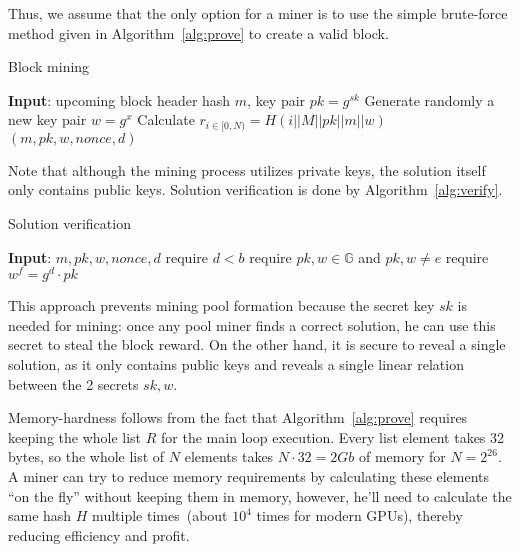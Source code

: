 Thus, we assume that the only option for a miner is to use the simple brute-force method given in Algorithm~\ref{alg:prove} to
create a valid block.

\begin{algorithm}[H]
    \caption{Block mining}
    \label{alg:prove}
    \begin{algorithmic}[1]
        \State \textbf{Input}: upcoming block header hash $m$, key pair $pk=g^{sk}$
        \State Generate randomly a new key pair $w=g^x$
        \State Calculate $r_{i \in [0,N)}=H(i||M||pk||m||w)$
        \State \Return $(m,pk,w,nonce,d)$
        \EndIf
        \EndWhile
    \end{algorithmic}
\end{algorithm}

Note that although the mining process utilizes private keys, the solution itself
only contains public keys. Solution verification is done by Algorithm~\ref{alg:verify}.

\begin{algorithm}[H]
    \caption{Solution verification}
    \label{alg:verify}
    \begin{algorithmic}[1]
        \State \textbf{Input}: $m,pk,w,nonce,d$
        \State require $d < b$
        \State require $pk,w\in \mathbb{G}$ and $pk,w \ne e$
        \State require $w^f = g^d \cdot pk$
    \end{algorithmic}
\end{algorithm}

This approach prevents mining pool formation because the secret key $sk$ is needed for mining: once any pool miner finds a correct solution, he can use this secret to steal the block reward. On the other hand, it is secure to reveal a single solution, as it only contains public keys and reveals a single linear relation between the 2 secrets $sk, w$.

Memory-hardness follows from the fact that Algorithm~\ref{alg:prove} requires keeping
the whole list $R$ for the main loop execution.
Every list element takes 32 bytes, so the whole list of $N$ elements
takes $N \cdot 32 = 2 Gb$ of memory for $N = 2^{26}$.
A miner can try to reduce memory requirements by calculating these elements ``on the fly''
without keeping them in memory, however, he'll need to calculate the same
hash $H$ multiple times~(about $10^4$ times for modern GPUs), thereby reducing efficiency and profit.

